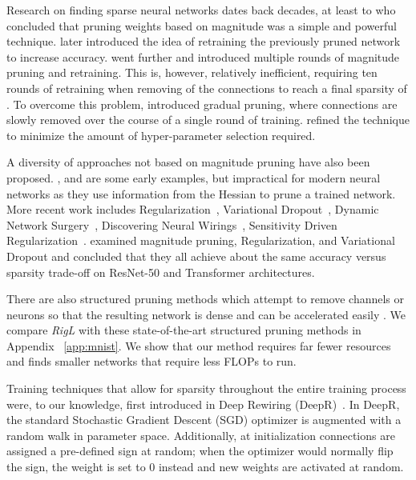\documentclass{article}
\begin{document}
\label{sec:related}
Research on finding sparse neural networks dates back decades, at least to \citet{Thimm95evaluatingpruning} who concluded that pruning weights based on magnitude was a simple and powerful technique.  \citet{sparse-connection-1997} later introduced the idea of retraining the previously pruned network to increase accuracy. \citet{deepcompression} went further and introduced multiple rounds of magnitude pruning and retraining.  This is, however, relatively inefficient, requiring ten rounds of retraining when removing  of the connections to reach a final sparsity of .  To overcome this problem, \citet{exploring-sparsity-rnn} introduced gradual pruning, where connections are slowly removed over the course of a single round of training.  \citet{gupta2018} refined the technique to minimize the amount of hyper-parameter selection required.

A diversity of approaches not based on magnitude pruning have also been proposed.  \citet{mozer1989}, \citet{lecun1990} and \citet{hassibi1993} are some early examples, but impractical for modern neural networks as they use information from the Hessian to prune a trained network.  More recent work includes  Regularization~\citep{Louizos2018}, Variational Dropout~\citep{variational-dropout}, Dynamic Network Surgery~\citep{DynamicSurgery}, Discovering Neural Wirings~\citep{wortsman2019dnw}, Sensitivity Driven Regularization~\citep{SparsityDrivenRegularization}. \citet{gale2019state} examined magnitude pruning,  Regularization, and Variational Dropout and concluded that they all achieve about the same accuracy versus sparsity trade-off on ResNet-50 and Transformer architectures.

There are also structured pruning methods which attempt to remove channels or neurons so that the resulting network is dense and can be accelerated easily \citep{vib2018, sbp2017, Louizos2018}. We compare \textit{RigL} with these state-of-the-art structured pruning methods in Appendix ~\ref{app:mnist}. We show that our method requires far fewer resources and finds smaller networks that require less FLOPs to run.

Training techniques that allow for sparsity throughout the entire training process were, to our knowledge, first introduced in Deep Rewiring (DeepR)~\citep{Bellec2017}. In DeepR, the standard Stochastic Gradient Descent (SGD) optimizer is augmented with a random walk in parameter space. Additionally, at initialization connections are assigned a pre-defined sign at random; when the optimizer would normally flip the sign, the weight is set to 0 instead and new weights are activated at random.
\end{document}
